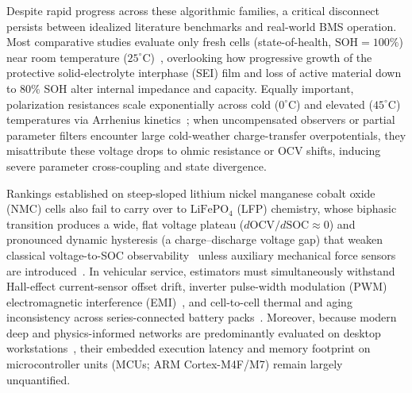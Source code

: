 \documentclass[11pt,a4paper]{article}
\begin{document}
Despite rapid progress across these algorithmic families, a critical disconnect persists between idealized literature benchmarks and real-world BMS operation. Most comparative studies evaluate only fresh cells (state-of-health, $\text{SOH} = 100\%$) near room temperature ($25^\circ\text{C}$)~\cite{Hu2012ecm,Chemali2018dnn,Le2026charging}, overlooking how progressive growth of the protective solid-electrolyte interphase (SEI) film and loss of active material down to $80\%$ SOH alter internal impedance and capacity. Equally important, polarization resistances scale exponentially across cold ($0^\circ\text{C}$) and elevated ($45^\circ\text{C}$) temperatures via Arrhenius kinetics~\cite{He2011ecm,Ren2019aging}; when uncompensated observers or partial parameter filters encounter large cold-weather charge-transfer overpotentials, they misattribute these voltage drops to ohmic resistance or OCV shifts, inducing severe parameter cross-coupling and state divergence.

Rankings established on steep-sloped lithium nickel manganese cobalt oxide (NMC) cells also fail to carry over to $\text{LiFePO}_4$ (LFP) chemistry, whose biphasic transition produces a wide, flat voltage plateau ($d\text{OCV}/d\text{SOC} \approx 0$) and pronounced dynamic hysteresis (a charge--discharge voltage gap) that weaken classical voltage-to-SOC observability~\cite{Roscher2011hysteresis,Verbrugge2004hysteresis,Marongiu2016hyst} unless auxiliary mechanical force sensors are introduced~\cite{Tian2025}. In vehicular service, estimators must simultaneously withstand Hall-effect current-sensor offset drift, inverter pulse-width modulation (PWM) electromagnetic interference (EMI)~\cite{Hashemi2020,Zheng2018inconsistency}, and cell-to-cell thermal and aging inconsistency across series-connected battery packs~\cite{Yang2024degradation,Zheng2018inconsistency}. Moreover, because modern deep and physics-informed networks are predominantly evaluated on desktop workstations~\cite{Song2019bilstm,Bhattacharya2024gpr}, their embedded execution latency and memory footprint on microcontroller units (MCUs; ARM Cortex-M4F/M7) remain largely unquantified.
\end{document}
